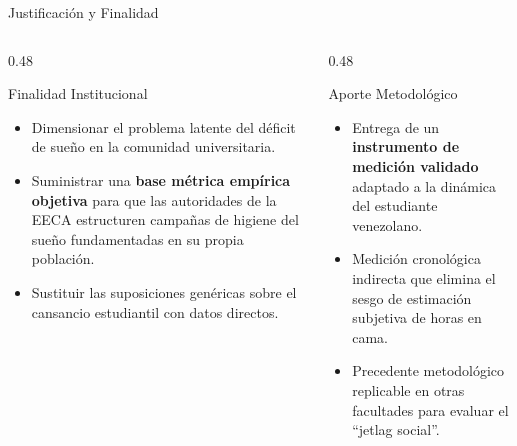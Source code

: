 \documentclass[10pt, aspectratio=169]{beamer}
\begin{document}
\begin{frame}{Justificación y Finalidad}
    \begin{columns}[T]
        \begin{column}{0.48\textwidth}
            \begin{block}{Finalidad Institucional}
                \begin{itemize}
                    \item Dimensionar el problema latente del déficit de sueño en la comunidad universitaria.
                    \item Suministrar una \textbf{base métrica empírica objetiva} para que las autoridades de la EECA estructuren campañas de higiene del sueño fundamentadas en su propia población.
                    \item Sustituir las suposiciones genéricas sobre el cansancio estudiantil con datos directos.
                \end{itemize}
            \end{block}
        \end{column}
        \begin{column}{0.48\textwidth}
            \begin{block}{Aporte Metodológico}
                \begin{itemize}
                    \item Entrega de un \textbf{instrumento de medición validado} adaptado a la dinámica del estudiante venezolano.
                    \item Medición cronológica indirecta que elimina el sesgo de estimación subjetiva de horas en cama.
                    \item Precedente metodológico replicable en otras facultades para evaluar el ``jetlag social''.
                \end{itemize}
            \end{block}
        \end{column}
    \end{columns}
\end{frame}
\end{document}
